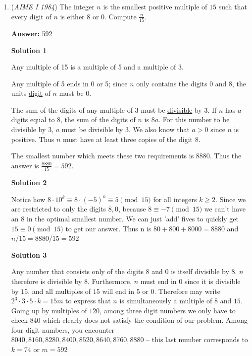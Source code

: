 \begin{enumerate}
	\item (\textit{AIME I 1984}) The integer $n$ is the smallest positive multiple of $15$ such that every digit of $n$ is either $8$ or $0$. Compute $\frac{n}{15}$.


 
 \textbf{Answer: }592



\textbf{Solution 1}

Any multiple of 15 is a multiple of 5 and a multiple of 3. 

 Any multiple of 5 ends in 0 or 5; since $n$ only contains the digits 0 and 8, the units \href{https://artofproblemsolving.com/wiki/index.php?title=Digit}{digit} of $n$ must be 0.  

 


 
The sum of the digits of any multiple of 3 must be \href{https://artofproblemsolving.com/wiki/index.php?title=Divisible}{divisible} by 3.  If $n$ has $a$ digits equal to 8, the sum of the digits of $n$ is $8a$.  For this number to be divisible by 3, $a$ must be divisible by 3. We also know that $a>0$ since $n$ is positive. Thus $n$ must have at least three copies of the digit 8.  

 The smallest number which meets these two requirements is 8880.  Thus the answer is $\frac{8880}{15} = \boxed{592}$.

 



\textbf{Solution 2}

Notice how $8 \cdot 10^k \equiv 8 \cdot (-5)^k \equiv 5 \pmod{15}$ for all integers $k \geq 2$. Since we are restricted to only the digits $8,0$, because $8\equiv -7 \pmod{15}$ we can't have an $8$ in the optimal smallest number. We can just 'add' fives to quickly get $15 \equiv 0 \pmod{15}$ to get our answer. Thus n is $80+800+8000=8880$ and $n/15=8880/15=\boxed{592}$




\textbf{Solution 3}

Any number that consists only of the digits $8$ and $0$ is itself divisible by $8$. $n$ therefore is divisible by $8$. Furthermore, $n$ must end in $0$ since it is divisible by $15$, and all multiples of $15$ will end in $5$ or $0$. Therefore may write $2^3 \cdot 3 \cdot 5 \cdot k = 15m$ to express that $n$ is simultaneously a multiple of $8$ and $15$. Going up by multiples of $120$, among three digit numbers we only have to check $840$ which clearly does not satisfy the condition of our problem. Among four digit numbers, you encounter $8040, 8160, 8280, 8400, 8520, 8640, 8760, 8880$ -- this last number corresponds to $k = 74$ or $m =  \boxed{592}$




\end{enumerate}
